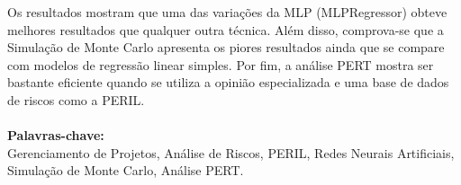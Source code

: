 \begin{flushbottom}
Os resultados mostram que uma das variações da MLP (MLPRegressor) obteve melhores resultados que qualquer outra técnica. Além disso, comprova-se que a Simulação de Monte Carlo apresenta os piores resultados ainda que se compare com modelos de regressão linear simples. Por fim, a análise PERT mostra ser bastante eficiente quando se utiliza a opinião especializada e uma base de dados de riscos como a PERIL.
\\
\\
\textbf{Palavras-chave:} \\ Gerenciamento de Projetos, Análise de Riscos, PERIL, Redes Neurais Artificiais, Simulação de Monte Carlo, Análise PERT.\end{flushbottom}
\newpage
